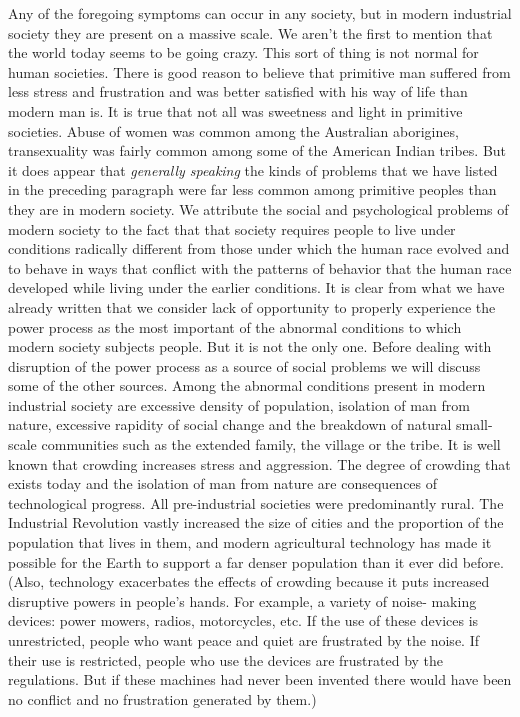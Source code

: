  Any of the foregoing symptoms can occur in any society, but in modern industrial society they are present on a massive scale. We aren’t the first to mention that the world today seems to be going crazy. This sort of thing is not normal for human societies. There is good reason to believe that primitive man suffered from less stress and frustration and was better satisfied with his way of life than modern man is. It is true that not all was sweetness and light in primitive societies. Abuse of women was common among the Australian aborigines, transexuality was fairly common among some of the American Indian tribes. But it does appear that {\em generally speaking} the kinds of problems that we have listed in the preceding paragraph were far less common among primitive peoples than they are in modern society.
 We attribute the social and psychological problems of modern society to the fact that that society requires people to live under conditions radically different from those under which the human race evolved and to behave in ways that conflict with the patterns of behavior that the human race developed while living under the earlier conditions. It is clear from what we have already written that we consider lack of opportunity to properly experience the power process as the most important of the abnormal conditions to which modern society subjects people. But it is not the only one. Before dealing with disruption of the power process as a source of social problems we will discuss some of the other sources.
 Among the abnormal conditions present in modern industrial society are excessive density of population, isolation of man from nature, excessive rapidity of social change and the breakdown of natural small-scale communities such as the extended family, the village or the tribe.
 It is well known that crowding increases stress and aggression. The degree of crowding that exists today and the isolation of man from nature are consequences of technological progress. All pre-industrial societies were predominantly rural. The Industrial Revolution vastly increased the size of cities and the proportion of the population that lives in them, and modern agricultural technology has made it possible for the Earth to support a far denser population than it ever did before. (Also, technology exacerbates the effects of crowding because it puts increased disruptive powers in people’s hands. For example, a variety of noise- making devices: power mowers, radios, motorcycles, etc. If the use of these devices is unrestricted, people who want peace and quiet are frustrated by the noise. If their use is restricted, people who use the devices are frustrated by the regulations. But if these machines had never been invented there would have been no conflict and no frustration generated by them.)\break
